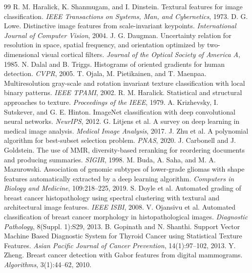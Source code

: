 \documentclass[10pt,twocolumn]{article}
\begin{document}
\balance
\begin{thebibliography}{99}
 R. M. Haralick, K. Shanmugam, and I. Dinstein. Textural features for image classification. \emph{IEEE Transactions on Systems, Man, and Cybernetics}, 1973.
 D. G. Lowe. Distinctive image features from scale-invariant keypoints. \emph{International Journal of Computer Vision}, 2004.
 J. G. Daugman. Uncertainty relation for resolution in space, spatial frequency, and orientation optimized by two-dimensional visual cortical filters. \emph{Journal of the Optical Society of America A}, 1985.
 N. Dalal and B. Triggs. Histograms of oriented gradients for human detection. \emph{CVPR}, 2005.
 T. Ojala, M. Pietikainen, and T. Maenpaa. Multiresolution gray-scale and rotation invariant texture classification with local binary patterns. \emph{IEEE TPAMI}, 2002.
 R. M. Haralick. Statistical and structural approaches to texture. \emph{Proceedings of the IEEE}, 1979.
 A. Krizhevsky, I. Sutskever, and G. E. Hinton. ImageNet classification with deep convolutional neural networks. \emph{NeurIPS}, 2012.
 G. Litjens et al. A survey on deep learning in medical image analysis. \emph{Medical Image Analysis}, 2017.
 J. Zhu et al. A polynomial algorithm for best-subset selection problem. \emph{PNAS}, 2020.
 J. Carbonell and J. Goldstein. The use of MMR, diversity-based reranking for reordering documents and producing summaries. \emph{SIGIR}, 1998.
 M. Buda, A. Saha, and M. A. Mazurowski. Association of genomic subtypes of lower-grade gliomas with shape features automatically extracted by a deep learning algorithm. \emph{Computers in Biology and Medicine}, 109:218--225, 2019.
 S. Doyle et al. Automated grading of breast cancer histopathology using spectral clustering with textural and architectural image features. \emph{IEEE ISBI}, 2008.
 V. Ojansivu et al. Automated classification of breast cancer morphology in histopathological images. \emph{Diagnostic Pathology}, 8(Suppl. 1):S29, 2013.
 B. Gopinath and N. Shanthi. Support Vector Machine Based Diagnostic System for Thyroid Cancer using Statistical Texture Features. \emph{Asian Pacific Journal of Cancer Prevention}, 14(1):97--102, 2013.
 Y. Zheng. Breast cancer detection with Gabor features from digital mammograms. \emph{Algorithms}, 3(1):44--62, 2010.

\end{thebibliography}
\end{document}

